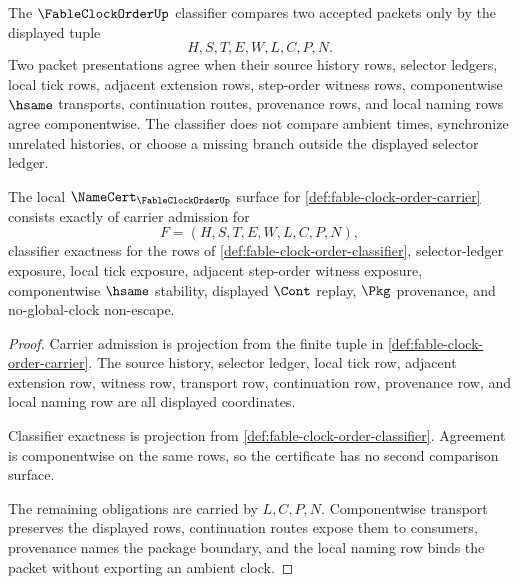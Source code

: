 \begin{definition}
\label{def:fable-clock-order-classifier}
The $\FableClockOrderUp$ classifier compares two accepted packets only by the displayed tuple
$$
H,S,T,E,W,L,C,P,N.
$$
Two packet presentations agree when their source history rows, selector ledgers, local tick rows, adjacent extension rows, step-order witness rows, componentwise $\hsame$ transports, continuation routes, provenance rows, and local naming rows agree componentwise. The classifier does not compare ambient times, synchronize unrelated histories, or choose a missing branch outside the displayed selector ledger.
\end{definition}

\begin{theorem}
\label{thm:fable-clock-order-namecert-obligations}
The local $\NameCert_{\FableClockOrderUp}$ surface for \autoref{def:fable-clock-order-carrier} consists exactly of carrier admission for
$$
F=(H,S,T,E,W,L,C,P,N),
$$
classifier exactness for the rows of \autoref{def:fable-clock-order-classifier}, selector-ledger exposure, local tick exposure, adjacent step-order witness exposure, componentwise $\hsame$ stability, displayed $\Cont$ replay, $\Pkg$ provenance, and no-global-clock non-escape.
\end{theorem}
\begin{proof}
Carrier admission is projection from the finite tuple in \autoref{def:fable-clock-order-carrier}. The source history, selector ledger, local tick row, adjacent extension row, witness row, transport row, continuation row, provenance row, and local naming row are all displayed coordinates.

Classifier exactness is projection from \autoref{def:fable-clock-order-classifier}. Agreement is componentwise on the same rows, so the certificate has no second comparison surface.

The remaining obligations are carried by $L,C,P,N$. Componentwise transport preserves the displayed rows, continuation routes expose them to consumers, provenance names the package boundary, and the local naming row binds the packet without exporting an ambient clock.
\end{proof}

